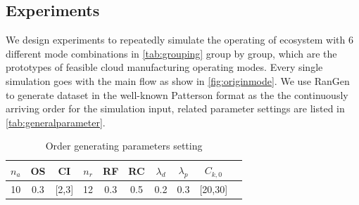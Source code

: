 
%     
%     
%     
%     
%     


\subsection{Experiments} %
\label{ssub:case_design}
We design experiments to repeatedly simulate the operating of ecosystem with 6 different mode combinations in \autoref{tab:grouping} group by group, which are the prototypes of feasible cloud manufacturing operating modes. Every single simulation goes with the main flow as show in \autoref{fig:originmode}. We use  RanGen \cite{Demeulemeester2003} to generate dataset in the well-known Patterson format as the the continuously arriving order for the simulation input, related parameter settings are listed in \autoref{tab:generalparameter}.
\begin{table}[htbp]
  \centering
  \scriptsize
  \caption{Order generating parameters setting}
    \begin{tabular}{cccccccccc}
    \toprule
    \textbf{$n_a$} & \textbf{OS} & \textbf{CI} & \textbf{$n_r$} & \textbf{RF} & \textbf{RC} & \textbf{$\lambda_d$} &\textbf{$\lambda_p$} & \textbf{$C_{k,0}$}\\
    \midrule
     10  &   0.3    &  [2,3]     &   12     &  0.3     &   0.5  & 0.2 & 0.3  & [20,30] \\
    \bottomrule
    \end{tabular}%
    {
    }
  \label{tab:generalparameter}%
\end{table}%


